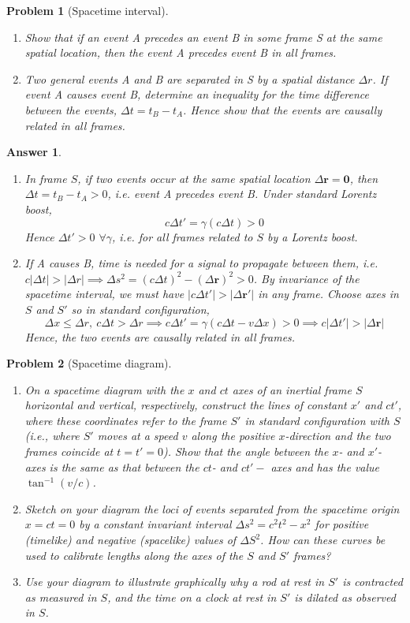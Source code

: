 \documentclass[a4paper]{article}
\newtheorem{ans}{Answer}[subsection]
\theoremstyle{new}
\newtheorem{qns}{Problem}[section]
\begin{document}
\begin{qns}[Spacetime interval]\leavevmode
\begin{enumerate}[label=(\alph*)]
\item Show that if an event A precedes an event B in some frame S at the same spatial location, then the event A precedes event B in all frames. 
\item Two general events A and B are separated in S by a spatial distance $\Delta r$. If event A causes event B, determine an inequality for the time difference between the events, $\Delta t=t_B-t_A$. Hence show that the events are causally related in all frames.
\end{enumerate}
\end{qns}
\begin{ans}\leavevmode
\begin{enumerate}[label=(\alph*)]
\item In frame $S$, if two events occur at the same spatial location $\Delta\mathbf{r}=\boldsymbol{0}$, then $\Delta t=t_B-t_A>0$, i.e. event A precedes event B. Under standard Lorentz boost,
$$c\Delta t'=\gamma(c\Delta t)>0$$
Hence $\Delta t'>0$ $\forall\gamma$, i.e. for all frames related to $S$ by a Lorentz boost.
\item If A causes B, time is needed for a signal to propagate between them, i.e. $c|\Delta t|>|\Delta r|\implies\Delta s^2=(c\Delta t)^2-(\Delta\mathbf{r})^2>0$. By invariance of the spacetime interval, we must have $|c\Delta t'|>|\Delta\mathbf{r'}|$ in any frame. Choose axes in $S$ and $S'$ so in standard configuration,
$$\Delta x\leq\Delta r,~c\Delta t>\Delta r\implies c\Delta t'=\gamma(c\Delta t-v\Delta x)>0\implies c|\Delta t'|>|\Delta\mathbf{r}|$$
Hence, the two events are causally related in all frames.
\end{enumerate}
\end{ans}
\newpage
\begin{qns}[Spacetime diagram]\leavevmode
\begin{enumerate}[label=(\alph*)]
\item On a spacetime diagram with the $x$ and $ct$ axes of an inertial frame $S$ horizontal and vertical, respectively, construct the lines of constant $x'$ and $ct'$, where these coordinates refer to the frame $S'$ in standard configuration with $S$ (i.e., where $S'$ moves at a speed $v$ along the positive $x$-direction and the two frames coincide at $t = t' = 0$). Show that the angle between the $x$- and $x'$- axes is the same as that between the $ct$- and $ct'-$ axes and has the value $\tan^{-1}(v/c)$.
\item Sketch on your diagram the loci of events separated from the spacetime origin $x = ct = 0$ by a constant invariant interval $\Delta s^2=c^2t^2-x^2$ for positive (timelike) and negative (spacelike) values of $\Delta S^2$. How can these curves be used to calibrate lengths along the axes of the $S$ and $S'$ frames?
\item Use your diagram to illustrate graphically why a rod at rest in $S'$ is \textit{contracted} as measured in $S$, and the time on a clock at rest in $S'$ is \textit{dilated} as observed in $S$.
\end{enumerate}
\end{qns}
\end{document}
